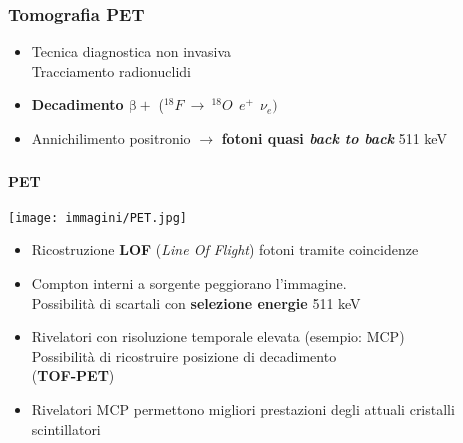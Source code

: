 \linespread{1.5}
\begin{frame}
\frametitle{Tomografia PET}
\begin{itemize}

	\item Tecnica diagnostica non invasiva
	\\ \setlength\parindent{24pt}Tracciamento radionuclidi
	\item \textbf{Decadimento $\mathrm{\beta +}$} ($^{18}F~ \to~^{18} O ~ ~e^+ ~~ \nu_e)$
	\item Annichilimento positronio $\to$ \textbf{fotoni quasi \textit{back to back}	} 511 keV
\end{itemize}
\end{frame}
\begin{frame}
\frametitle{}
\framesubtitle{PET}
\begin{minipage}{0.35\textwidth}
\texttt{[image: immagini/PET.jpg]}
\end{minipage}	\hfill
\begin{minipage}{0.5\textwidth}
\begin{itemize}
	\item Ricostruzione \textbf{LOF} (\textit{Line Of Flight}) fotoni tramite coincidenze
		\item Compton interni a sorgente peggiorano l'immagine.
	\\	Possibilità di scartali con \textbf{selezione energie} 511 keV
\end{itemize}
\end{minipage}
\begin{minipage}{\linewidth}
\begin{itemize}
	\item Rivelatori con risoluzione temporale elevata (esempio: MCP)
	\\ \setlength\parindent{24pt} Possibilità di ricostruire posizione di decadimento \\ \setlength				\parindent{24pt}(\textbf{TOF-PET})
	\item Rivelatori MCP permettono migliori prestazioni degli attuali cristalli scintillatori
\end{itemize}
\end{minipage}
\end{frame}

